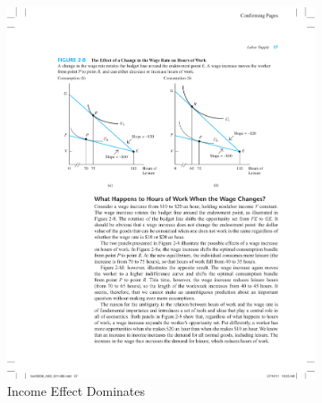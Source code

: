 \begin{figure}[H]
    
    \begin{subfigure}{0.5\textwidth}
    \includegraphics[scale = 0.75]{graphs/budget_line_3-1.pdf}
    \caption{Income Effect Dominates}
    \label{graph:budgetline31}
    \end{subfigure}
    \begin{subfigure}{0.5\textwidth}

\end{subfigure}
\end{figure}
